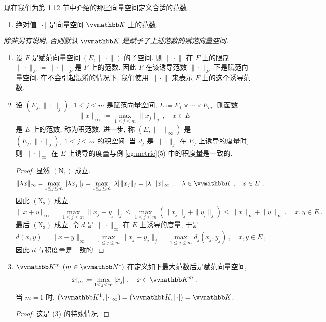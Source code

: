 现在我们为第 1.12 节中介绍的那些向量空间定义合适的范数.

\begin{example}\label{eg:norms}
    \begin{enumerate}
        \item 绝对值 \(|\!\cdot\!|\) 是向量空间 \(\K\) 上的范数.
    \end{enumerate}

    \begin{center}
        \textsl{除非另有说明, 否则默认 \(\K\) 是赋予了上述范数的赋范向量空间.}
    \end{center}

    \begin{enumerate}[start=2]
        \item 设 \(F\) 是赋范向量空间 \((E, \|\!\cdot\!\|)\) 的子空间. 则 \(\|\!\cdot\!\|\) 在 \(F\) 上的限制 \(\|\!\cdot\!\|_F \coloneqq \|\!\cdot\!\| \big|_F\) 是 \(F\) 上的范数. 因此 \(F\) 在该诱导范数 \(\|\!\cdot\!\|_F\) 下是赋范向量空间. 在不会引起混淆的情况下, 我们使用 \(\|\!\cdot\!\|\) 来表示 \(F\) 上的这个诱导范数.
        \item 设 \((E_j, \|\!\cdot\!\|_j),\ 1 \leq j \leq m\) 是赋范向量空间, \(E \coloneqq E_1 \times \cdots \times E_m\). 则函数
        \[
            \|x\|_\infty \coloneqq \max_{1 \leq j \leq m} \|x_j\|_j\ ,\quad x \in E
        \]
        是 \(E\) 上的范数, 称为积范数. 进一步, 称 \((E, \|\!\cdot\!\|_\infty)\) 是 \((E_j, \|\!\cdot\!\|_j),\ 1 \leq j \leq m\) 的积空间. 当 \(d_j\) 是 \(\|\!\cdot\!\|_j\) 在 \(E_j\) 上诱导的度量时, 则 \(\|\!\cdot\!\|_\infty\) 在 \(E\) 上诱导的度量与例 \ref{eg:metric}(5) 中的积度量是一致的.
        \begin{proof}
            显然 \hyperref[ax:norm]{\((\mathrm N_1)\)} 成立.
            \[
                \|\lambda x\|_\infty = \max_{1 \leq j \leq m} \|\lambda x_j\|_j = \max_{1 \leq j \leq m} |\lambda|\, \|x_j\|_j = |\lambda|\, \|x\|_\infty\ ,\quad \lambda \in \K\ ,\quad x \in E\ ,
            \]
            因此 \hyperref[ax:norm]{\((\mathrm N_2)\)} 成立.
            \[
                \|x + y\|_\infty = \max_{1 \leq j \leq m} \|x_j + y_j\|_j \leq \max_{1 \leq j \leq m} (\|x_j\|_j + \|y_j\|_j) \leq \|x\|_\infty + \|y\|_\infty\ ,\quad x, y \in E\ ,
            \]
            最后 \hyperref[ax:norm]{\((\mathrm N_3)\)} 成立. 令 \(d\) 是 \(\|\!\cdot\!\|_\infty\) 在 \(E\) 上诱导的度量, 于是
            \[
                d(x, y) = \|x - y\|_\infty = \max_{1 \leq j \leq m} \|x_j - y_j\|_j = \max_{1 \leq j \leq m} d_j(x_j, y_j)\ ,\quad x, y \in E\ ,
            \]
            因此 \(d\) 与积度量是一致的.
        \end{proof}
        \item \(\K^m\ (m \in \N^\ast)\) 在定义如下最大范数后是赋范向量空间,
        \[
            |x|_\infty \coloneqq \max_{1 \leq j \leq m} |x_j|\ ,\quad x \in \K^m\ .
        \]
        当 \(m = 1\) 时, \((\K^1, |\!\cdot\!|_\infty) = (\K, |\!\cdot\!|) = \K\).
        \begin{proof}
            这是 (3) 的特殊情况.
        \end{proof}
    \end{enumerate}
\end{example}

